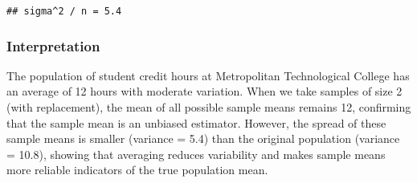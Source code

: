 \documentclass[
]{article}
\begin{document}
\begin{verbatim}
## sigma^2 / n = 5.4
\end{verbatim}

\subsubsection{Interpretation}\label{interpretation-1}

The population of student credit hours at Metropolitan Technological
College has an average of 12 hours with moderate variation. When we take
samples of size 2 (with replacement), the mean of all possible sample
means remains 12, confirming that the sample mean is an unbiased
estimator. However, the spread of these sample means is smaller
(variance = 5.4) than the original population (variance = 10.8), showing
that averaging reduces variability and makes sample means more reliable
indicators of the true population mean.
\end{document}
